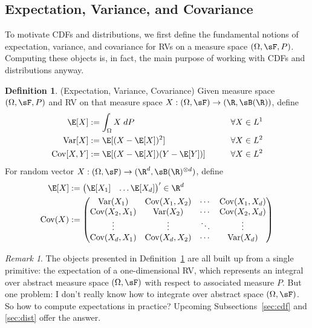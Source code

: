 \documentclass[12pt]{article}
\theoremstyle{plain}
\theoremstyle{definition}
\newtheorem{defn}[thm]{Definition}
\theoremstyle{remark}
\newtheorem*{rmk}{Remark}
\newcommand{\ra}{\rightarrow}
\newcommand{\Cov}{\operatorname{Cov}}
\newcommand{\Var}{\operatorname{Var}}
\begin{document}
\subsection{Expectation, Variance, and Covariance}
\label{sec:exp}

To motivate CDFs and distributions, we first define the fundamental
notions of expectation, variance, and covariance for RVs on a measure
space $(\Omega,\sF,P)$. Computing these objects is, in fact, the main
purpose of working with CDFs and distributions anyway.

\begin{defn}(Expectation, Variance, Covariance)
\label{defn:exp}
Given measure space $(\Omega,\sF,P)$ and RV on that measure space
$X:(\Omega,\sF)\ra (\R,\sB(\R))$, define
\begin{alignat*}{3}
  \E[X] &:= \int_\Omega X \; dP &&\forall X\in L^1\\
  \Var[X] &:= \E[(X-\E[X])^2]  &&\forall X\in L^2\\
  \Cov[X,Y] &:= \E[(X-\E[X])(Y-\E[Y])] \qquad&&\forall X\in L^2
\end{alignat*}
For random vector $X:(\Omega,\sF)\ra(\R^d,\sB(\R)^{\otimes d})$,
define
\begin{align*}
  \E[X] &:=
  \begin{pmatrix}
    \E[X_1] & \ldots \E[X_d]
  \end{pmatrix}'
  \in\R^d
  \\
  \Cov(X)
  &:=
  \begin{pmatrix}
    \Var(X_1) & \Cov(X_1,X_2) & \cdots & \Cov(X_1,X_d) \\
    \Cov(X_2,X_1) & \Var(X_2) & \cdots & \Cov(X_2,X_d) \\
    \vdots & \vdots & \ddots & \vdots \\
    \Cov(X_d,X_1) & \Cov(X_d,X_2) & \cdots & \Var(X_d) \\
  \end{pmatrix}
\end{align*}
\end{defn}
\begin{rmk}
The objects presented in Definition~\ref{defn:exp} are all built up from
a single primitive:
the expectation of a one-dimensional RV, which represents an integral
over abstract measure space $(\Omega,\sF)$ with respect to associated
measure $P$.  But one problem: I don't really know how to integrate over
abstract space $(\Omega,\sF)$.  So how to compute expectations in
practice?
Upcoming Subsections~\ref{sec:cdf} and \ref{sec:dist} offer the answer.
\end{rmk}
\end{document}
